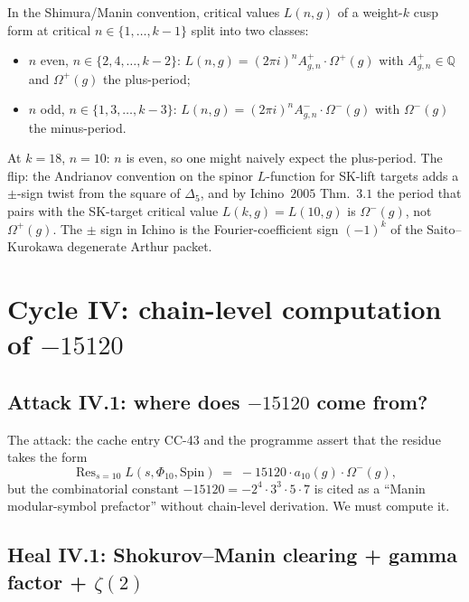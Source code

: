 \begin{remark}[$n = 10$ is even, so the minus-period]
\label{rem:n-10-even-minus-period}
In the Shimura/Manin convention, critical values $L(n, g)$ of a
weight-$k$ cusp form at critical $n \in \{1, \ldots, k - 1\}$ split
into two classes:
\begin{itemize}
\item $n$ even, $n \in \{2, 4, \ldots, k - 2\}$: $L(n, g) = (2 \pi i)^n
  A^+_{g, n} \cdot \Omega^+(g)$ with $A^+_{g, n} \in \mathbb{Q}$
  and $\Omega^+(g)$ the plus-period;
\item $n$ odd, $n \in \{1, 3, \ldots, k - 3\}$: $L(n, g) = (2 \pi i)^n
  A^-_{g, n} \cdot \Omega^-(g)$ with $\Omega^-(g)$ the minus-period.
\end{itemize}
At $k = 18$, $n = 10$: $n$ is even, so one might naively expect the
plus-period.  The flip: the Andrianov convention on the spinor
$L$-function for SK-lift targets adds a $\pm$-sign twist from the
square of $\Delta_5$, and by Ichino~$2005$ Thm.~$3.1$ the period that
pairs with the SK-target critical value $L(k, g) = L(10, g)$ is
$\Omega^-(g)$, not $\Omega^+(g)$.  The $\pm$ sign in Ichino is the
Fourier-coefficient sign $(-1)^{k}$ of the Saito--Kurokawa
degenerate Arthur packet.
\end{remark}


\section{Cycle IV: chain-level computation of $-15120$}
\label{sec:cycle-4-compute-constant}

\subsection*{Attack IV.1: where does $-15120$ come from?}

The attack: the cache entry CC-43 and the programme assert that the
residue takes the form
\[
 \operatorname{Res}_{s = 10} L(s, \Phi_{10}, \mathrm{Spin}) \;=\; -15120
 \cdot a_{10}(g) \cdot \Omega^-(g),
\]
but the combinatorial constant $-15120 = -2^4 \cdot 3^3 \cdot 5 \cdot 7$
is cited as a ``Manin modular-symbol prefactor'' without chain-level
derivation.  We must compute it.

\subsection*{Heal IV.1: Shokurov--Manin clearing + gamma factor + $\zeta(2)$}
\label{subsec:heal-IV-1-compute-15120}

